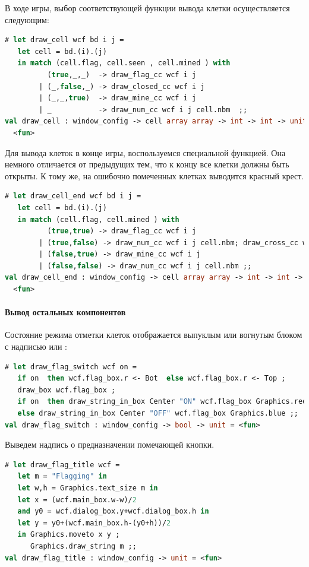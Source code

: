 В ходе игры, выбор соответствующей функции вывода клетки осуществляется 
следующим:

\begin{lstlisting}[language=OCaml]
# let draw_cell wcf bd i j =
   let cell = bd.(i).(j)
   in match (cell.flag, cell.seen , cell.mined ) with
          (true,_,_)  -> draw_flag_cc wcf i j
        | (_,false,_) -> draw_closed_cc wcf i j
        | (_,_,true)  -> draw_mine_cc wcf i j
        | _           -> draw_num_cc wcf i j cell.nbm  ;;
val draw_cell : window_config -> cell array array -> int -> int -> unit =
  <fun>
\end{lstlisting}

Для вывода клеток в конце игры, воспользуемся специальной функцией. Она немного 
отличается от предыдущих тем, что к концу все клетки должны быть открыты. К тому 
же, на ошибочно помеченных клетках выводится красный крест.

\begin{lstlisting}[language=OCaml]
# let draw_cell_end wcf bd i j =
   let cell = bd.(i).(j)
   in match (cell.flag, cell.mined ) with
          (true,true) -> draw_flag_cc wcf i j
        | (true,false) -> draw_num_cc wcf i j cell.nbm; draw_cross_cc wcf i j
        | (false,true) -> draw_mine_cc wcf i j
        | (false,false) -> draw_num_cc wcf i j cell.nbm ;;
val draw_cell_end : window_config -> cell array array -> int -> int -> unit =
  <fun>
\end{lstlisting}

\paragraph{Вывод остальных компонентов}

Состояние режима отметки клеток отображается выпуклым или вогнутым блоком с 
надписью  или :

\begin{lstlisting}[language=OCaml]
# let draw_flag_switch wcf on =
   if on  then wcf.flag_box.r <- Bot  else wcf.flag_box.r <- Top ;
   draw_box wcf.flag_box ;
   if on  then draw_string_in_box Center "ON" wcf.flag_box Graphics.red
   else draw_string_in_box Center "OFF" wcf.flag_box Graphics.blue ;;
val draw_flag_switch : window_config -> bool -> unit = <fun>
\end{lstlisting}

Выведем надпись о предназначении помечающей кнопки.

\begin{lstlisting}[language=OCaml]
# let draw_flag_title wcf =
   let m = "Flagging" in
   let w,h = Graphics.text_size m in
   let x = (wcf.main_box.w-w)/2
   and y0 = wcf.dialog_box.y+wcf.dialog_box.h in
   let y = y0+(wcf.main_box.h-(y0+h))/2 
   in Graphics.moveto x y ;
      Graphics.draw_string m ;;
val draw_flag_title : window_config -> unit = <fun>
\end{lstlisting}

